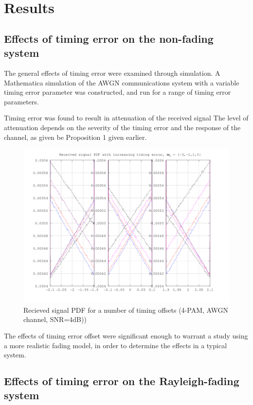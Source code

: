\chapter{Results}

\section{Effects of timing error on the non-fading system}

The general effects of timing error were examined through simulation. A Mathematica simulation of the AWGN communications system with a variable timing error parameter was constructed, and run for a range of timing error parameters.

Timing error was found to result in attenuation of the received signal The level of attenuation depends on the severity of the timing error and the response of the channel, as given be Proposition 1 given earlier.

\begin{figure}[htbp]
\centering
\includegraphics[width=0.8\linewidth]{../../../plots/4pamdecisionerror.png}
\caption[Non-fading received symbol PDF]{Recieved signal PDF for a number of timing offsets (4-PAM, AWGN channel, SNR=4dB))}
\end{figure}

The effects of timing error offset were significant enough to warrant a study using a more realistic fading model, in order to determine the effects in a typical system.

\section{Effects of timing error on the Rayleigh-fading system}

